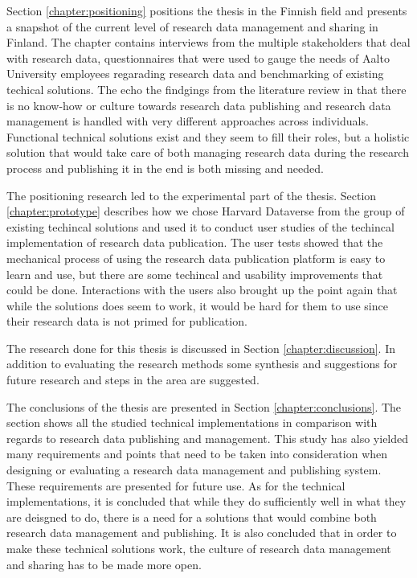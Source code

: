 Section \ref{chapter:positioning} positions the thesis in the Finnish field and
presents a snapshot of the current level of research data management and
sharing in Finland. The chapter contains interviews from the multiple
stakeholders that deal with research data, questionnaires that were used to
gauge the needs of Aalto University employees regarading research data and
benchmarking of existing techical solutions. The echo the findgings from the
literature review in that there is no know-how or culture towards research
data publishing and research data management is handled with very different
approaches across individuals. Functional technical solutions exist and they
seem to fill their roles, but a holistic solution that would take care of both
managing research data during the research process and publishing it in the end
is both missing and needed.

The positioning research led to the experimental part of the thesis. Section
\ref{chapter:prototype} describes how we chose Harvard Dataverse from the
group of existing techincal solutions and used it to conduct user studies of
the techincal implementation of research data publication. The user tests
showed that the mechanical process of using the research data publication
platform is easy to learn and use, but there are some techincal and usability
improvements that could be done. Interactions with the users also brought up
the point again that while the solutions does seem to work, it would be hard
for them to use since their research data is not primed for publication.

The research done for this thesis is discussed in Section
\ref{chapter:discussion}. In addition to evaluating the research methods
some synthesis and suggestions for future research and steps in the area
are suggested.

The conclusions of the thesis are presented in Section
\ref{chapter:conclusions}. The section shows all the studied technical
implementations in comparison with regards to research data publishing
and management. This study has also yielded many requirements and points
that need to be taken into consideration when designing or evaluating a
research data management and publishing system. These requirements are
presented for future use. As for the technical implementations, it is
concluded that while they do sufficiently well in what they are deisgned to
do, there is a need for a solutions that would combine both research data
management and publishing. It is also concluded that in order to make these
technical solutions work, the culture of research data management and sharing
has to be made more open.

